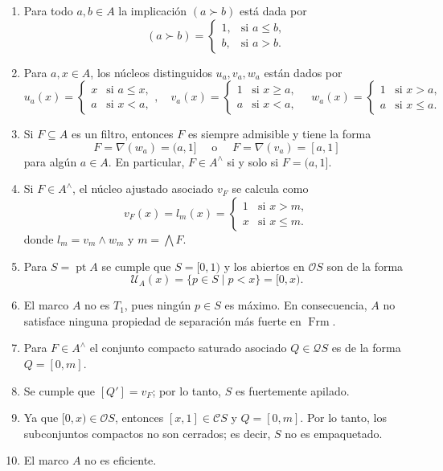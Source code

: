 \documentclass[12pt]{article}
\DeclareMathOperator{\Frm}{Frm}
\DeclareMathOperator{\pt}{pt}
\begin{document}
\begin{enumerate}
\item Para todo $a,b\in A$ la implicación $(a\succ b)$ está dada por
\[
(a\succ b)=\begin{cases}
1, & \text{si } a\leq b,\\
b, & \text{si } a>b.
\end{cases}
\]
\item Para $a, x\in A$, los núcleos distinguidos $u_a, v_a, w_a$ están dados por
\[
u_a(x)=\begin{cases}
  x & \text{si }a\leq x,\\
  a & \text{si }x< a,
\end{cases}, \quad v_a(x)=\begin{cases}
1 & \text{si } x\geq a,\\
a & \text{si } x<a,
\end{cases} \quad w_a(x)=\begin{cases}
1 & \text{si } x>a,\\
a & \text{si } x\leq a.
\end{cases}
\]

\item Si $F\subseteq A$ es un filtro, entonces $F$ es siempre admisible y tiene la forma
\[
F=\nabla(w_a)=(a, 1]\quad \mbox{ o }\quad F=\nabla(v_a)=[a, 1]
\]
para algún $a\in A$. En particular, $F\in A^\wedge$ si y solo si $F=(a, 1]$.

\item Si $F\in A^\wedge$, el núcleo ajustado asociado $v_F$ se calcula como
\begin{equation}\label{eq:lm}
v_F(x)=l_m(x)=\begin{cases}
1 & \text{si } x> m,\\
x & \text{si } x\leq m.
\end{cases}
\end{equation}
donde $l_m=v_m\wedge w_m$ y $m=\bigwedge F$.
\item Para $S=\pt A$ se cumple que $S=[0,1)$ y los abiertos en $\mathcal{O}S$ son de la forma
\[
\mathcal{U}_A(x)=\{p\in S\mid p<x\}=[0,x).
\]
\item El marco $A$ no es $T_1$, pues ningún $p\in S$ es máximo. En consecuencia, $A$ no satisface ninguna propiedad de separación más fuerte en $\Frm$.
\item Para $F\in A^\wedge$ el conjunto compacto saturado asociado $Q\in \mathcal{Q}S$ es de la forma $Q=[0,m]$.
\item Se cumple que $[Q']=v_F$; por lo tanto, $S$ es fuertemente apilado.
\item Ya que $[0, x)\in \mathcal{O}S$, entonces $[x, 1]\in \mathcal{C}S$ y $Q=[0, m]$. Por lo tanto, los subconjuntos compactos no son cerrados; es decir, $S$ no es empaquetado.
\item El marco $A$ no es eficiente.

\end{enumerate}
\end{document}
